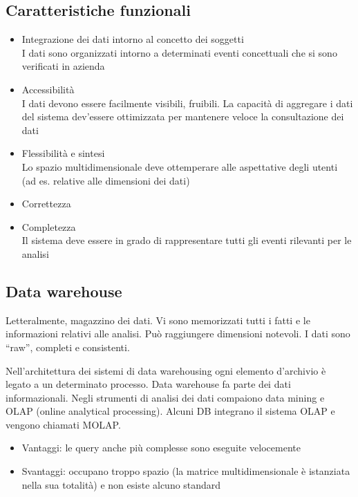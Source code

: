 \subsection{Caratteristiche
funzionali}\label{caratteristiche-funzionali}

\begin{itemize}

\item
  Integrazione dei dati intorno al concetto dei soggetti\\
  I dati sono organizzati intorno a determinati eventi concettuali che
  si sono verificati in azienda
\item
  Accessibilità\\
  I dati devono essere facilmente visibili, fruibili. La capacità di
  aggregare i dati del sistema dev'essere ottimizzata per mantenere
  veloce la consultazione dei dati
\item
  Flessibilità e sintesi\\
  Lo spazio multidimensionale deve ottemperare alle aspettative degli
  utenti (ad es. relative alle dimensioni dei dati)
\item
  Correttezza
\item
  Completezza\\
  Il sistema deve essere in grado di rappresentare tutti gli eventi
  rilevanti per le analisi
\end{itemize}

\subsection{Data warehouse}\label{data-warehouse}

Letteralmente, magazzino dei dati. Vi sono memorizzati tutti i fatti e
le informazioni relativi alle analisi. Può raggiungere dimensioni
notevoli. I dati sono ``raw'', completi e consistenti.

Nell'architettura dei sistemi di data warehousing ogni elemento
d'archivio è legato a un determinato processo. Data warehouse fa parte
dei dati informazionali. Negli strumenti di analisi dei dati compaiono
data mining e OLAP (online analytical processing). Alcuni DB integrano
il sistema OLAP e vengono chiamati MOLAP.

\begin{itemize}

\item
  Vantaggi: le query anche più complesse sono eseguite velocemente
\item
  Svantaggi: occupano troppo spazio (la matrice multidimensionale è
  istanziata nella sua totalità) e non esiste alcuno standard
\end{itemize}

